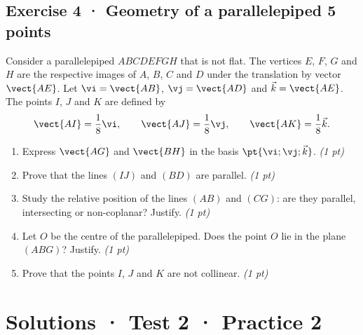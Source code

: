 \subsection*{Exercise 4 · Geometry of a parallelepiped \hfill 5 points}Consider a parallelepiped $ABCDEFGH$ that is not flat. The vertices $E$, $F$, $G$ and $H$ are the respective images of $A$, $B$, $C$ and $D$ under the translation by vector $\vect{AE}$.
Let $\vi=\vect{AB}$, $\vj=\vect{AD}$ and $\vec k=\vect{AE}$.
The points $I$, $J$ and $K$ are defined by
\[\vect{AI}=\frac1{8}\vi,\qquad\vect{AJ}=\frac1{8}\vj,\qquad\vect{AK}=\frac1{8}\vec k.\]

\begin{enumerate}

\item Express $\vect{AG}$ and $\vect{BH}$ in the basis $\pt{\vi;\vj;\vec k}$. \hfill\textit{(1 pt)}

\item Prove that the lines $(IJ)$ and $(BD)$ are parallel. \hfill\textit{(1 pt)}

\item Study the relative position of the lines $(AB)$ and $(CG)$: are they parallel, intersecting or non-coplanar? Justify. \hfill\textit{(1 pt)}

\item Let $O$ be the centre of the parallelepiped. Does the point $O$ lie in the plane $(ABG)$? Justify. \hfill\textit{(1 pt)}

\item Prove that the points $I$, $J$ and $K$ are not collinear. \hfill\textit{(1 pt)}

\end{enumerate}

\ifmxteacher\mxnewpage

\section*{Solutions · Test 2 · Practice 2}\label{cor:2-2}

